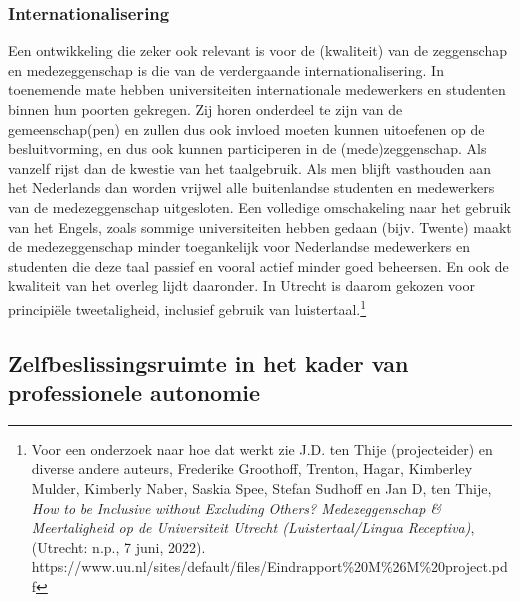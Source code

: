 \documentclass[smallauthor, chapterhaspagenum, nochapterinheader, pagenuminheader,  bigchapnum,medium2, tocpages,  garamond, titleinheader]{jote-book}
\begin{document}
	\subsubsection{Internationalisering}



	Een ontwikkeling die zeker ook relevant is voor de (kwaliteit) van de zeggenschap en medezeggenschap is die van de verdergaande internationalisering. In toenemende mate hebben universiteiten internationale medewerkers en studenten binnen hun poorten gekregen. Zij horen onderdeel te zijn van de gemeenschap(pen) en zullen dus ook invloed moeten kunnen uitoefenen op de besluitvorming, en dus ook kunnen participeren in de (mede)zeggenschap. Als vanzelf rijst dan de kwestie van het taalgebruik. Als men blijft vasthouden aan het Nederlands dan worden vrijwel alle buitenlandse studenten en medewerkers van de medezeggenschap uitgesloten. Een volledige omschakeling naar het gebruik van het Engels, zoals sommige universiteiten hebben gedaan (bijv. Twente) maakt de medezeggenschap minder toegankelijk voor Nederlandse medewerkers en studenten die deze taal passief en vooral actief minder goed beheersen. En ook de kwaliteit van het overleg lijdt daaronder. In Utrecht is daarom gekozen voor principiële tweetaligheid, inclusief gebruik van luistertaal.\footnote{Voor een onderzoek naar hoe dat werkt zie J.D. ten Thije (projecteider) en diverse andere auteurs, Frederike Groothoff, Trenton, Hagar, Kimberley Mulder, Kimberly Naber, Saskia Spee, Stefan Sudhoff en Jan D, ten Thije, \emph{How }\emph{to}\emph{ }\emph{be}\emph{ }\emph{Inclusive}\emph{ without }\emph{Excluding}\emph{ }\emph{Others}\emph{? Medezeggenschap \& Meertaligheid op de Universiteit Utrecht (Luistertaal/Lingua }\emph{Receptiva}\emph{)}, (Utrecht: n.p., 7 juni, 2022). https://www.uu.nl/sites/default/files/Eindrapport\%20M\%26M\%20project.pdf}



	\subsection{Zelfbeslissingsruimte in het kader van professionele autonomie}
\end{document}
